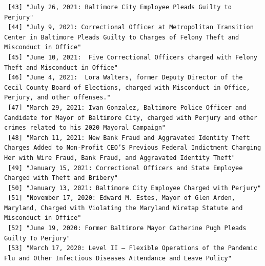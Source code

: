 \documentclass[
  letterpaper,
  DIV=11,
  numbers=noendperiod]{scrreprt}
\begin{document}
\begin{verbatim}
 [43] "July 26, 2021: Baltimore City Employee Pleads Guilty to Perjury"                                                                                                                                                                                     
 [44] "July 9, 2021: Correctional Officer at Metropolitan Transition Center in Baltimore Pleads Guilty to Charges of Felony Theft and Misconduct in Office"                                                                                                 
 [45] "June 10, 2021:  Five Correctional Officers charged with Felony Theft and Misconduct in Office"                                                                                                                                                       
 [46] "June 4, 2021:  Lora Walters, former Deputy Director of the Cecil County Board of Elections, charged with Misconduct in Office, Perjury, and other offenses."                                                                                         
 [47] "March 29, 2021: Ivan Gonzalez, Baltimore Police Officer and Candidate for Mayor of Baltimore City, charged with Perjury and other crimes related to his 2020 Mayoral Campaign"                                                                       
 [48] "March 11, 2021: New Bank Fraud and Aggravated Identity Theft Charges Added to Non-Profit CEO’S Previous Federal Indictment Charging Her with Wire Fraud, Bank Fraud, and Aggravated Identity Theft"                                                  
 [49] "January 15, 2021: Correctional Officers and State Employee Charged with Theft and Bribery"                                                                                                                                                           
 [50] "January 13, 2021: Baltimore City Employee Charged with Perjury"                                                                                                                                                                                      
 [51] "November 17, 2020: Edward M. Estes, Mayor of Glen Arden, Maryland, Charged with Violating the Maryland Wiretap Statute and Misconduct in Office"                                                                                                     
 [52] "June 19, 2020: Former Baltimore Mayor Catherine Pugh Pleads Guilty To Perjury"                                                                                                                                                                       
 [53] "March 17, 2020: Level II – Flexible Operations of the Pandemic Flu and Other Infectious Diseases Attendance and Leave Policy"                                                                                                                        

\end{verbatim}
\end{document}
